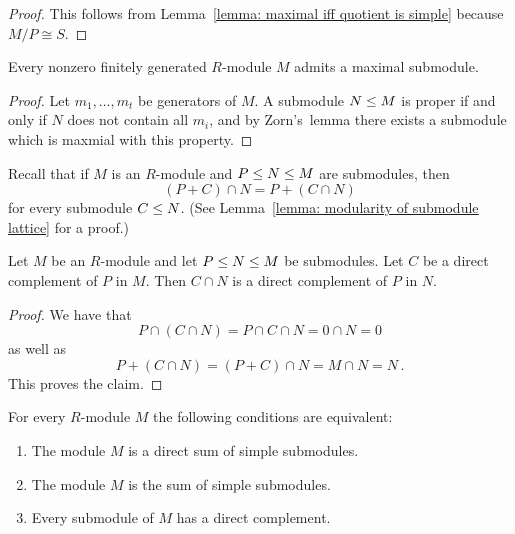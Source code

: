 \begin{proof}
  This follows from Lemma~\ref{lemma: maximal iff quotient is simple} because $M/P \cong S$.
\end{proof}


\begin{lemma}
  \label{lemma: fg modules contain max submodules}
  Every nonzero finitely generated $R$-module $M$ admits a maximal submodule.
\end{lemma}


\begin{proof}
  Let $m_1, \dotsc, m_t$ be generators of $M$.
  A submodule $N \leq M$ is proper if and only if $N$ does not contain all $m_i$, and by Zorn’s~lemma there exists a submodule which is maxmial with this property.
\end{proof}


\begin{fluff}
  Recall that if $M$ is an $R$-module and $P \leq N \leq M$ are submodules, then
  \[
      (P + C) \cap N
    = P + (C \cap N)
  \]
  for every submodule $C \leq N$.
  (See Lemma~\ref{lemma: modularity of submodule lattice} for a proof.)
\end{fluff}


\begin{corollary}
  \label{corollary: direct complements in submodules}
  Let $M$ be an $R$-module and let $P \leq N \leq M$ be submodules.
  Let $C$ be a direct complement of $P$ in $M$.
  Then $C \cap N$ is a direct complement of $P$ in $N$.
\end{corollary}


\begin{proof}
  We have that
  \[
      P \cap (C \cap N)
    = P \cap C \cap N
    = 0 \cap N
    = 0
  \]
  as well as
  \[
      P + (C \cap N)
    = (P + C) \cap N
    = M \cap N
    = N \,.
  \]
  This proves the claim.
\end{proof}




\begin{proposition}
  \label{proposition: characterisation semisimple modules}
  For every $R$-module $M$ the following conditions are equivalent:
  \begin{enumerate}
    \item
      \label{enumerate: direct sum of simple}
      The module $M$ is a direct sum of simple submodules. 
    \item
      \label{enumerate: sum of simple}
      The module $M$ is the sum of simple submodules.
    \item
      \label{enumerate: direct complements}
      Every submodule of $M$ has a direct complement.
  \end{enumerate}
\end{proposition}


